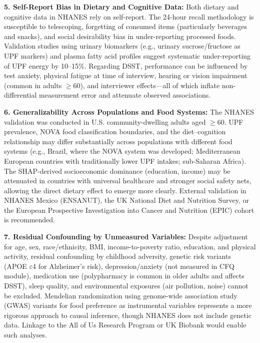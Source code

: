 \documentclass[journal,twoside,10pt]{IEEEtran}
\begin{document}
\textbf{5. Self-Report Bias in Dietary and Cognitive Data:}
Both dietary and cognitive data in NHANES rely on self-report. The 24-hour recall methodology is susceptible to telescoping, forgetting of consumed items (particularly beverages and snacks), and social desirability bias in under-reporting processed foods. Validation studies using urinary biomarkers (e.g., urinary sucrose/fructose as UPF markers) and plasma fatty acid profiles suggest systematic under-reporting of UPF energy by 10--15\%. Regarding DSST, performance can be influenced by test anxiety, physical fatigue at time of interview, hearing or vision impairment (common in adults $\geq$60), and interviewer effects---all of which inflate non-differential measurement error and attenuate observed associations.

\textbf{6. Generalizability Across Populations and Food Systems:}
The NHANES validation was conducted in U.S. community-dwelling adults aged $\geq$60. UPF prevalence, NOVA food classification boundaries, and the diet--cognition relationship may differ substantially across populations with different food systems (e.g., Brazil, where the NOVA system was developed; Mediterranean European countries with traditionally lower UPF intakes; sub-Saharan Africa). The SHAP-derived socioeconomic dominance (education, income) may be attenuated in countries with universal healthcare and stronger social safety nets, allowing the direct dietary effect to emerge more clearly. External validation in NHANES Mexico (ENSANUT), the UK National Diet and Nutrition Survey, or the European Prospective Investigation into Cancer and Nutrition (EPIC) cohort is recommended.

\textbf{7. Residual Confounding by Unmeasured Variables:}
Despite adjustment for age, sex, race/ethnicity, BMI, income-to-poverty ratio, education, and physical activity, residual confounding by childhood adversity, genetic risk variants (APOE $\varepsilon$4 for Alzheimer's risk), depression/anxiety (not measured in CFQ module), medication use (polypharmacy is common in older adults and affects DSST), sleep quality, and environmental exposures (air pollution, noise) cannot be excluded. Mendelian randomization using genome-wide association study (GWAS) variants for food preference as instrumental variables represents a more rigorous approach to causal inference, though NHANES does not include genetic data. Linkage to the All of Us Research Program or UK Biobank would enable such analyses.
\end{document}
